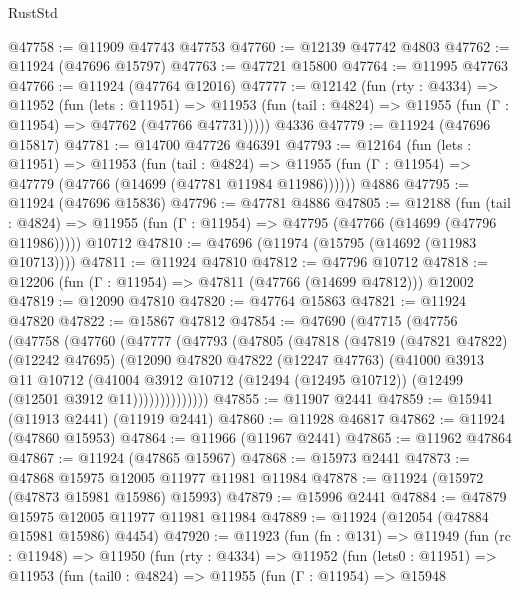 \begin{lexlean}{RustStd}
\begin{coremodule}
{\begin{coremodule}
{{{{{{{{{{{{{{{{{{{{{{{{{{{{{{{{{{{{{{{{{{{{{{{{{{{{{{{{{{{{{{{{{{{{{{{{{{{{{{{{@47758 := @11909 @47743 @47753
@47760 := @12139 @47742 @4803
@47762 := @11924 (@47696 @15797)
@47763 := @47721 @15800
@47764 := @11995 @47763
@47766 := @11924 (@47764 @12016)
@47777 := @12142
    (fun (rty : @4334) =>
    @11952
      (fun (lets : @11951) =>
      @11953 (fun (tail : @4824) => @11955 (fun (Γ : @11954) => @47762 (@47766 @47731)))))
    @4336
@47779 := @11924 (@47696 @15817)
@47781 := @14700 @47726 @46391
@47793 := @12164
    (fun (lets : @11951) =>
    @11953
      (fun (tail : @4824) =>
      @11955 (fun (Γ : @11954) => @47779 (@47766 (@14699 (@47781 @11984 @11986))))))
    @4886
@47795 := @11924 (@47696 @15836)
@47796 := @47781 @4886
@47805 := @12188
    (fun (tail : @4824) => @11955 (fun (Γ : @11954) => @47795 (@47766 (@14699 (@47796 @11986)))))
    @10712
@47810 := @47696 (@11974 (@15795 (@14692 (@11983 @10713))))
@47811 := @11924 @47810
@47812 := @47796 @10712
@47818 := @12206 (fun (Γ : @11954) => @47811 (@47766 (@14699 @47812))) @12002
@47819 := @12090 @47810
@47820 := @47764 @15863
@47821 := @11924 @47820
@47822 := @15867 @47812
@47854 := @47690
    (@47715
      (@47756
        (@47758
          (@47760
            (@47777
              (@47793
                (@47805
                  (@47818
                    (@47819
                      (@47821 @47822)
                      (@12242 @47695)
                      (@12090
                        @47820
                        @47822
                        (@12247 @47763)
                        (@41000
                          @3913
                          @11
                          @10712
                          (@41004
                            @3912
                            @10712
                            (@12494 (@12495 @10712))
                            (@12499 (@12501 @3912 @11))))))))))))))
@47855 := @11907 @2441
@47859 := @15941 (@11913 @2441) (@11919 @2441)
@47860 := @11928 @46817
@47862 := @11924 (@47860 @15953)
@47864 := @11966 (@11967 @2441)
@47865 := @11962 @47864
@47867 := @11924 (@47865 @15967)
@47868 := @15973 @2441
@47873 := @47868 @15975 @12005 @11977 @11981 @11984
@47878 := @11924 (@15972 (@47873 @15981 @15986) @15993)
@47879 := @15996 @2441
@47884 := @47879 @15975 @12005 @11977 @11981 @11984
@47889 := @11924 (@12054 (@47884 @15981 @15986) @4454)
@47920 := @11923
    (fun (fn : @131) =>
    @11949
      (fun (rc : @11948) =>
      @11950
        (fun (rty : @4334) =>
        @11952
          (fun (lets0 : @11951) =>
          @11953
            (fun (tail0 : @4824) =>
            @11955
              (fun (Γ : @11954) =>
              @15948
}}}}}}}}}}}}}}}}}}}}}}}}}}}}}}}}}}}}}}}}}}}}}}}}}}}}}}}}}}}}}}}}}}}}}}}}}}}}}}}}
\end{coremodule}}
\end{coremodule}
\end{lexlean}
